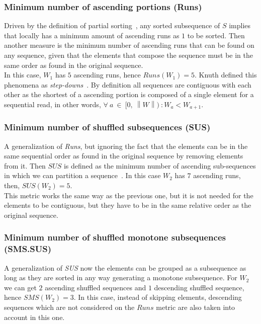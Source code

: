 \subsubsection{Minimum number of ascending portions (Runs)}
Driven by the definition of partial sorting~\cite{10.5555/1614191}, any sorted subsequence of $S$ implies that locally has a minimum amount of ascending runs as $1$ to be sorted. Then another measure is the minimum number of ascending runs that can be found on any sequence, given that the elements that compose the sequence must be in the same order as found in the original sequence.\\

In this case, $W_1$ has $5$ ascending runs, hence $Runs(W_1) =5$. Knuth defined this phenomena as \textit{step-downs}~\cite{10.5555/270146}. By definition all sequences are contiguous with each other as the shortest of a ascending portion is composed of a single element for a sequential read, in other words, $\forall~a~\in~[0,~\left\|W\right\|)~: W_a < W_{a+1}$.\\

\subsubsection{Minimum number of shuffled subsequences (SUS)}
A generalization of \textit{Runs}, but ignoring the fact that the elements can be in the same sequential order as found in the original sequence by removing elements from it. Then $SUS$ is defined as the minimum number of ascending sub-sequences in which we can partition a sequence~\cite{Carlsson_Levcopoulos_Petersson_1993}. In this case $W_2$ has $7$ ascending runs, then, $SUS(W_2) = 5$.\\

This metric works the same way as the previous one, but it is not needed for the elements to be contiguous, but they have to be in the same relative order as the original sequence.\\


\subsubsection{Minimum number of shuffled monotone subsequences (SMS.SUS)}
A generalization of \textit{SUS} now the elements can be grouped as a subsequence as long as they are sorted in any way generating a monotone subsequence. For $W_2$ we can get $2$ ascending shuffled sequences\cite{Carlsson_Levcopoulos_Petersson_1993} and $1$ descending shuffled sequence, hence $SMS(W_2) = 3$. In this case, instead of skipping elements, descending sequences which are not considered on the $Runs$ metric are also taken into account in this one.\\



